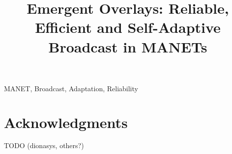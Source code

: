 \documentclass[10pt, conference]{IEEEtran}
\begin{document}
	
\title{Emergent Overlays: Reliable, Efficient and Self-Adaptive Broadcast in MANETs}


\author{
\IEEEauthorblockA{}}

\maketitle

\begin{abstract}

\end{abstract}

\begin{IEEEkeywords}
MANET, Broadcast, Adaptation, Reliability
\end{IEEEkeywords}










\section*{Acknowledgments}

TODO (dionasys, others?)



\end{document}
